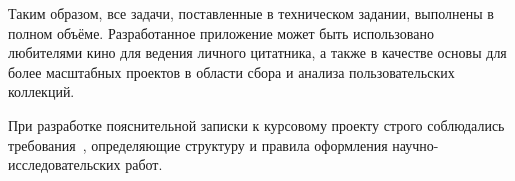 Таким образом, все задачи, поставленные в техническом задании, выполнены в полном объёме. 
Разработанное приложение может быть использовано любителями кино для ведения личного 
цитатника, а также в качестве основы для более масштабных проектов в области сбора и 
анализа пользовательских коллекций.

При разработке пояснительной записки к курсовому проекту строго соблюдались 
требования~\cite{gost_report}, определяющие структуру и правила оформления 
научно-исследовательских работ.